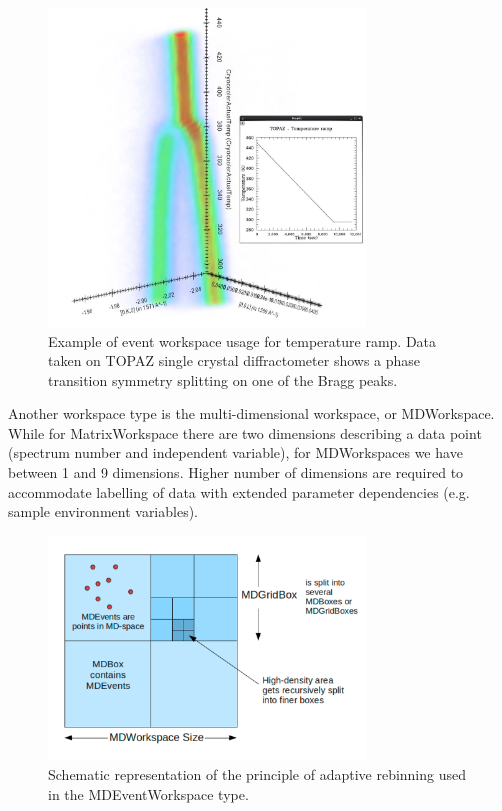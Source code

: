 \documentclass[1p]{elsarticle}
\begin{document}
\begin{figure}[!ht]
\centerline{\includegraphics[width=0.75\textwidth]{TemperatureRamp.pdf}}
\caption{Example of event workspace usage for temperature ramp. Data taken on TOPAZ single crystal diffractometer shows a phase transition symmetry splitting on one of the Bragg peaks.}
\label{fig:TempRamp}
\end{figure}
  
Another workspace type is the multi-dimensional workspace, or MDWorkspace. While for MatrixWorkspace there are two dimensions describing a data point (spectrum number and independent variable), for MDWorkspaces we have between 1 and 9 dimensions. Higher number of dimensions are required to accommodate labelling of data with extended parameter dependencies (e.g. sample environment variables). 

\begin{figure}[!ht]
\centerline{\includegraphics[width=0.75\textwidth]{MDEvents.pdf}}
\caption{Schematic representation of the principle of adaptive rebinning used in the MDEventWorkspace type.}
\label{fig:MDEvent}
\end{figure}
\end{document}
